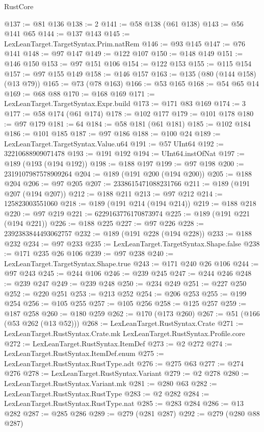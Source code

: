 \begin{lexlean}{RustCore}
\begin{coremodule}
@137 := @81 @136
@138 := 2
@141 := @58 @138 (@61 @138)
@143 := @56 @141 @65
@144 := @137 @143
@145 := LexLeanTarget.TargetSyntax.Prim.natRem
@146 := @93 @145
@147 := @76 @141
@148 := @97 @147
@149 := @122 @107
@150 := @148 @149
@151 := @146 @150
@153 := @97 @151 @106
@154 := @122 @153
@155 := @115 @154
@157 := @97 @155 @149
@158 := @146 @157
@163 := @135 (@80 (@144 @158) (@13 @79))
@165 := @73 (@78 @163)
@166 := @53 @165
@168 := @54 @65 @14
@169 := @68 @88
@170 := @168 @169
@171 := LexLeanTarget.TargetSyntax.Expr.build
@173 := @171 @83 @169
@174 := 3
@177 := @58 @174 (@61 @174)
@178 := @102 @177
@179 := @101 @178
@180 := @97 @179
@181 := 64
@184 := @58 @181 (@61 @181)
@185 := @102 @184
@186 := @101 @185
@187 := @97 @186
@188 := @100 @24
@189 := LexLeanTarget.TargetSyntax.Value.u64
@191 := @57 UInt64
@192 := 32210688909071478
@193 := @191 @192
@194 := UInt64.instOfNat
@197 := @189 (@193 (@194 @192))
@198 := @188 @197
@199 := @97 @198
@200 := 2319107987578909264
@204 := @189 (@191 @200 (@194 @200))
@205 := @188 @204
@206 := @97 @205
@207 := 2338615471088231766
@211 := @189 (@191 @207 (@194 @207))
@212 := @188 @211
@213 := @97 @212
@214 := 125823003551060
@218 := @189 (@191 @214 (@194 @214))
@219 := @188 @218
@220 := @97 @219
@221 := 6229163776170873974
@225 := @189 (@191 @221 (@194 @221))
@226 := @188 @225
@227 := @97 @226
@228 := 2392383844493062757
@232 := @189 (@191 @228 (@194 @228))
@233 := @188 @232
@234 := @97 @233
@235 := LexLeanTarget.TargetSyntax.Shape.false
@238 := @171 @235 @26 @106
@239 := @97 @238
@240 := LexLeanTarget.TargetSyntax.Shape.true
@243 := @171 @240 @26 @106
@244 := @97 @243
@245 := @244 @106
@246 := @239 @245
@247 := @244 @246
@248 := @239 @247
@249 := @239 @248
@250 := @234 @249
@251 := @227 @250
@252 := @220 @251
@253 := @213 @252
@254 := @206 @253
@255 := @199 @254
@256 := @105 @255
@257 := @105 @256
@258 := @125 @257
@259 := @187 @258
@260 := @180 @259
@262 := @170 (@173 @260)
@267 := @51 (@166 (@53 @262 (@13 @52)))
@268 := LexLeanTarget.RustSyntax.Crate
@271 := LexLeanTarget.RustSyntax.Crate.mk LexLeanTarget.RustSyntax.Profile.core
@272 := LexLeanTarget.RustSyntax.ItemDef
@273 := @2 @272
@274 := LexLeanTarget.RustSyntax.ItemDef.enum
@275 := LexLeanTarget.RustSyntax.RustType.adt
@276 := @275 @63
@277 := @274 @276
@278 := LexLeanTarget.RustSyntax.Variant
@279 := @2 @278
@280 := LexLeanTarget.RustSyntax.Variant.mk
@281 := @280 @63
@282 := LexLeanTarget.RustSyntax.RustType
@283 := @2 @282
@284 := LexLeanTarget.RustSyntax.RustType.nat
@285 := @283 @284
@286 := @13 @282
@287 := @285 @286
@289 := @279 (@281 @287)
@292 := @279 (@280 @88 @287)

\end{coremodule}
\end{lexlean}
